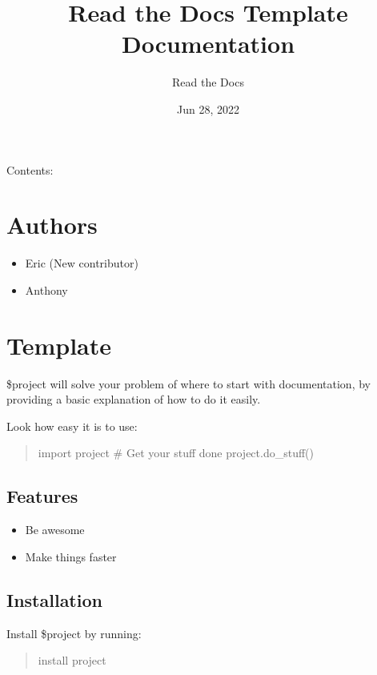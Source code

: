 \documentclass[letterpaper,10pt,english]{sphinxmanual}
\title{Read the Docs Template Documentation}
\date{Jun 28, 2022}
\author{Read the Docs}
\begin{document}
\pagestyle{empty}
\sphinxmaketitle
\pagestyle{plain}
\sphinxtableofcontents
\pagestyle{normal}
\label{\detokenize{index::doc}}


\sphinxAtStartPar
Contents:

\sphinxstepscope


\chapter{Authors}
\label{\detokenize{AUTHORS:authors}}\label{\detokenize{AUTHORS::doc}}\begin{itemize}
\item {} 
\sphinxAtStartPar
Eric (New contributor)

\item {} 
\sphinxAtStartPar
Anthony

\end{itemize}

\sphinxstepscope


\chapter{Template}
\label{\detokenize{README:template}}\label{\detokenize{README::doc}}
\sphinxAtStartPar
\$project will solve your problem of where to start with documentation,
by providing a basic explanation of how to do it easily.

\sphinxAtStartPar
Look how easy it is to use:
\begin{quote}

\sphinxAtStartPar
import project
\# Get your stuff done
project.do\_stuff()
\end{quote}


\section{Features}
\label{\detokenize{README:features}}\begin{itemize}
\item {} 
\sphinxAtStartPar
Be awesome

\item {} 
\sphinxAtStartPar
Make things faster

\end{itemize}


\section{Installation}
\label{\detokenize{README:installation}}
\sphinxAtStartPar
Install \$project by running:
\begin{quote}

\sphinxAtStartPar
install project
\end{quote}
\end{document}
